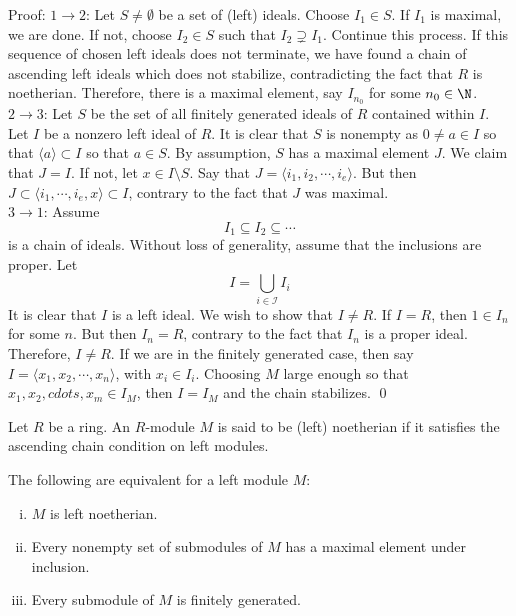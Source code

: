 Proof: $1\rightarrow 2$: Let $S \neq \emptyset$ be a set of (left) ideals. Choose $I_1 \in S$. If $I_1$ is maximal, we are done. If not, choose $I_2 \in S$ such that $I_2 \supsetneq I_1$. Continue this process. If this sequence of chosen left ideals does not terminate, we have found a chain of ascending left ideals which does not stabilize, contradicting the fact that $R$ is noetherian. Therefore, there is a maximal element, say $I_{n_0}$ for some $n_0 \in \N$. \\

$2 \rightarrow 3$: Let $S$ be the set of all finitely generated ideals of $R$ contained within $I$. Let $I$ be a nonzero left ideal of $R$. It is clear that $S$ is nonempty as $0\neq a \in I$ so that $\langle a \rangle \subset I$ so that $a \in S$. By assumption, $S$ has a maximal element $J$. We claim that $J=I$. If not, let $x \in I \setminus S$. Say that $J=\langle i_1,i_2,\cdots,i_e \rangle$. But then $J \subset \langle i_1,\cdots,i_e,x\rangle \subset I$, contrary to the fact that $J$ was maximal. \\

$3 \rightarrow 1$: Assume
\[
I_1 \subseteq I_2 \subseteq \cdots
\]
is a chain of ideals. Without loss of generality, assume that the inclusions are proper. Let
\[
I=\bigcup_{i \in \mathcal{I}} I_i
\]
It is clear that $I$ is a left ideal. We wish to show that $I \neq R$. If $I=R$, then $1 \in I_n$ for some $n$. But then $I_n=R$, contrary to the fact that $I_n$ is a proper ideal. Therefore, $I \neq R$. If we are in the finitely generated case, then say $I=\langle x_1,x_2,\cdots,x_n \rangle$, with $x_i \in I_{i}$. Choosing $M$ large enough so that $x_1,x_2,cdots,x_m \in I_M$, then $I=I_M$ and the chain stabilizes. \qed \\

\begin{dfn}
Let $R$ be a ring. An $R$-module $M$ is said to be (left) noetherian if it satisfies the ascending chain condition on left modules. 
\end{dfn}

\begin{thm}
The following are equivalent for a left module $M$:
\begin{enumerate}[(i)]
\item $M$ is left noetherian.
\item Every nonempty set of submodules of $M$ has a maximal element under inclusion.
\item Every submodule of $M$ is finitely generated.
\end{enumerate}
\end{thm}

